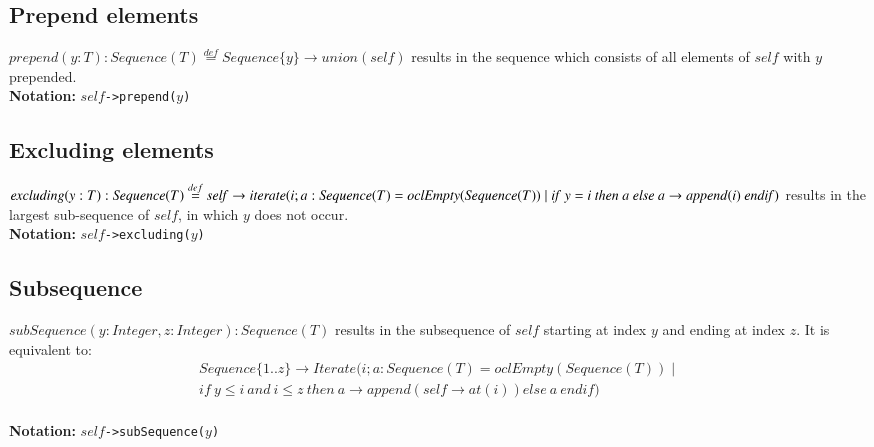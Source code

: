 \subsection{Prepend elements}
$\mathit{prepend}(y:T):\mathit{Sequence}(T)\stackrel{def}{=}
  \mathit{Sequence}\{y\}\rightarrow\mathit{union}(\mathit{self})$ results in the sequence
  which consists of all elements of $\mathit{self}$ with $y$ prepended.\\
  {\bf Notation:} $\mathit{self}$\verb+->prepend(+$y$\verb+)+
\subsection{Excluding elements}
$\mathit{excluding}(y:T):\mathit{Sequence}(T)\stackrel{def}{=} \mathit{self}\rightarrow
  \mathit{iterate}(i;a:\mathit{Sequence}(T)=\mathit{oclEmpty}(\mathit{Sequence}(T))\mid \mathit{if}\
  y=i\ \mathit{then}\ a\ \linebreak[2]
  \mathit{else}\ a\rightarrow\mathit{append}(i)\ \mathit{endif})$ results in
  the largest sub-sequence of $\mathit{self}$, in which $y$ does not occur.\\
  {\bf Notation:} $\mathit{self}$\verb+->excluding(+$y$\verb+)+
\subsection{Subsequence}
$\mathit{subSequence}(y:\mathit{Integer},z:\mathit{Integer}):\mathit{Sequence}(T)$
  results in the subsequence of $\mathit{self}$ starting at index $y$ and
  ending at index $z$.  It is equivalent to:
  \begin{multline*}
    \mathit{Sequence}\{1..z\}\rightarrow\mathit{Iterate}(i;
    a:\mathit{Sequence}(T)=\mathit{oclEmpty}(\mathit{Sequence}(T))\mid{}\\
    \mathit{if}\ y\leq i\ \mathit{and}\ i\leq z\ \mathit{then}\
    a\rightarrow\mathit{append}(\mathit{self}\rightarrow\mathit{at}(i))\mathit{else}\ a\ \mathit{endif})
  \end{multline*}\\
  {\bf Notation:} $\mathit{self}$\verb+->subSequence(+$y$\verb+)+
